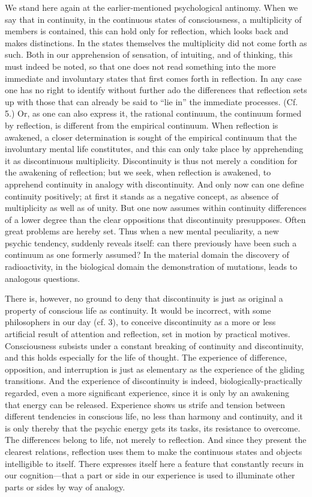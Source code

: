 \documentclass[12pt,a4paper]{book}
\newcommand{\opage}[1]{\marginnote{\footnotesize\textit{[#1]}}}
\begin{document}
We stand here again at the earlier-mentioned psychological antinomy. When we
say that in continuity, in the continuous states of consciousness, a
multiplicity of members is contained, this can hold only for reflection,
which looks back and makes distinctions. In the states themselves the
multiplicity did not come forth as such. Both in our apprehension of
sensation, of intuiting, and of thinking, this must indeed be noted, so that
one does not read something into the more immediate and involuntary states
that first comes forth in reflection. In any case one has no right to
identify without further ado the differences that reflection sets up with
those that can already be said to ``lie in'' the immediate processes. (Cf.
5.) Or, as one can also express it, the rational continuum, the continuum
formed by reflection, is different from the empirical continuum. When
reflection is awakened, a closer determination is sought of the empirical
continuum that the involuntary \opage{158}mental life constitutes, and this can only
take place by apprehending it as discontinuous multiplicity. Discontinuity
is thus not merely a condition for the awakening of reflection; but we seek,
when reflection is awakened, to apprehend continuity in analogy with
discontinuity. And only now can one define continuity positively; at first
it stands as a negative concept, as absence of multiplicity as well as of
unity. But one now assumes within continuity differences of a lower degree
than the clear oppositions that discontinuity presupposes. Often great
problems are hereby set. Thus when a new mental peculiarity, a new psychic
tendency, suddenly reveals itself: can there previously have been such a
continuum as one formerly assumed? In the material domain the discovery of
radioactivity, in the biological domain the demonstration of mutations,
leads to analogous questions.

There is, however, no ground to deny that discontinuity is just as original
a property of conscious life as continuity. It would be incorrect, with some
philosophers in our day (cf. 3), to conceive discontinuity as a more or less
artificial result of attention and reflection, set in motion by practical
motives. Consciousness subsists under a constant breaking of continuity and
discontinuity, and this holds especially for the life of thought. The
experience of difference, opposition, and interruption is just as elementary
as the experience of the gliding transitions. And the experience of
discontinuity is indeed, biologically-practically regarded, even a more
significant experience, since it is only by an awakening that energy can be
released. Experience shows us strife and tension between different tendencies
in conscious life, no less than harmony and continuity, and it is only
thereby that the psychic energy gets its tasks, its resistance to overcome.
The differences belong to life, not merely to reflection. And since they
present the clearest relations, reflection uses them to make the continuous
states and objects intelligible to itself. There expresses itself here a
\opage{159}feature that constantly recurs in our cognition---that a part or side in our
experience is used to illuminate other parts or sides by way of analogy.
\end{document}
